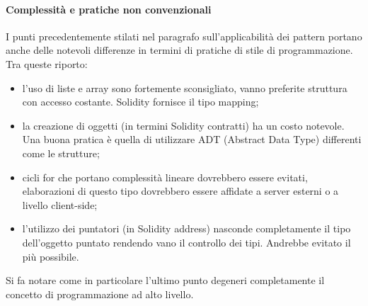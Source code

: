 \paragraph{Complessità e pratiche non convenzionali}
I punti precedentemente stilati nel paragrafo sull’applicabilità dei pattern portano anche delle notevoli differenze in termini di pratiche di stile di programmazione. Tra queste riporto:
\begin{itemize}
    \item l’uso di liste e array sono fortemente sconsigliato, vanno preferite struttura con accesso costante. Solidity fornisce il tipo mapping;
    \item la creazione di oggetti (in termini Solidity contratti) ha un costo notevole. Una buona pratica è quella di utilizzare ADT (Abstract Data Type) differenti come le strutture;
    \item cicli for che portano complessità lineare dovrebbero essere evitati, elaborazioni di questo tipo dovrebbero essere affidate a server esterni o a livello client-side;
    \item l’utilizzo dei puntatori (in Solidity address) nasconde completamente il tipo dell’oggetto puntato rendendo vano il controllo dei tipi. Andrebbe evitato il più possibile.
\end{itemize}
Si fa notare come in particolare l’ultimo punto degeneri completamente il concetto di programmazione ad alto livello.

